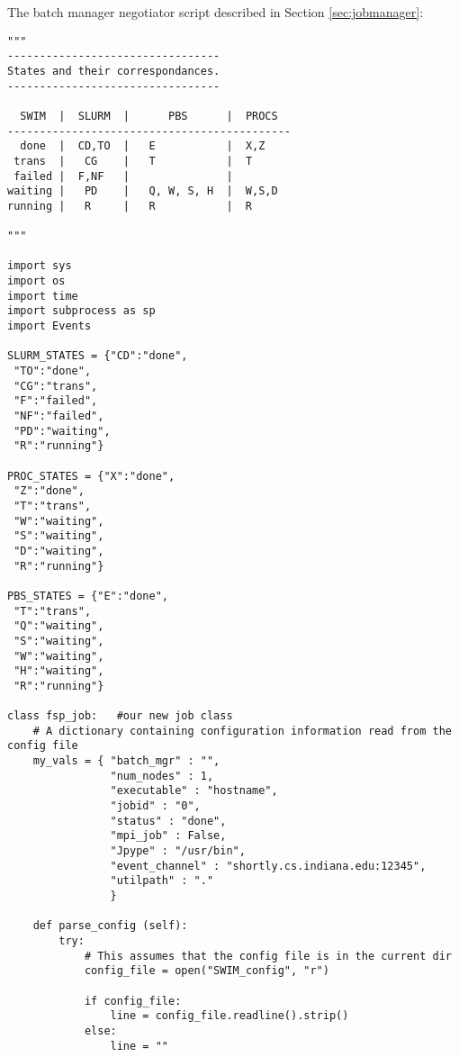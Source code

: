 The batch manager negotiator script described in Section \ref{sec:jobmanager}:
\begin{lstlisting}[frame=single,
    caption={batch\_mgmt\_script.py}, label=batchscript]
"""
---------------------------------
States and their correspondances.
---------------------------------

  SWIM  |  SLURM  |      PBS      |  PROCS
--------------------------------------------
  done  |  CD,TO  |   E           |  X,Z
 trans  |   CG    |   T           |  T
 failed |  F,NF   |               |
waiting |   PD    |   Q, W, S, H  |  W,S,D
running |   R     |   R           |  R

"""

import sys
import os
import time
import subprocess as sp
import Events

SLURM_STATES = {"CD":"done",
 "TO":"done",
 "CG":"trans",
 "F":"failed",
 "NF":"failed",
 "PD":"waiting",
 "R":"running"}

PROC_STATES = {"X":"done",
 "Z":"done",
 "T":"trans",
 "W":"waiting",
 "S":"waiting",
 "D":"waiting",
 "R":"running"}

PBS_STATES = {"E":"done",
 "T":"trans",
 "Q":"waiting",
 "S":"waiting",
 "W":"waiting",
 "H":"waiting",
 "R":"running"}

class fsp_job:   #our new job class
    # A dictionary containing configuration information read from the config file
    my_vals = { "batch_mgr" : "",
                "num_nodes" : 1,
                "executable" : "hostname",
                "jobid" : "0",
                "status" : "done",
                "mpi_job" : False,
                "Jpype" : "/usr/bin",
                "event_channel" : "shortly.cs.indiana.edu:12345",
                "utilpath" : "."
                }

    def parse_config (self):
        try:
            # This assumes that the config file is in the current dir
            config_file = open("SWIM_config", "r")
            
            if config_file:
                line = config_file.readline().strip()
            else:
                line = ""
                

\end{lstlisting}
